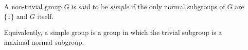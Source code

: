 \documentclass{article}
\begin{document}
A non-trivial group $G$ is said to be \emph{simple}
if the only normal subgroups of $G$ are $\{1\}$ and $G$ itself.

Equivalently, a simple group is a group in which the trivial subgroup is a maximal normal subgroup.
\end{document}
